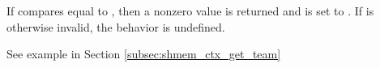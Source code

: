 \begin{apidefinition}
{  If  compares equal to ,
  then a nonzero value is returned and  is set to
  .
  If  is otherwise invalid, the behavior is undefined.
}



\begin{apiexamples}
     See example in Section \ref{subsec:shmem_ctx_get_team}
\end{apiexamples}

\end{apidefinition}

